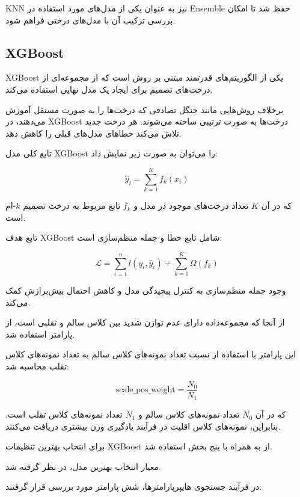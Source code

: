 \documentclass[10pt,a4paper,twocolumn]{article}
\begin{document}
KNN نیز به عنوان یکی از مدل‌های مورد استفاده در Ensemble
حفظ شد تا امکان بررسی ترکیب آن با مدل‌های درختی فراهم شود.


\subsection{XGBoost}

XGBoost یکی از الگوریتم‌های قدرتمند مبتنی بر روش
 است که از مجموعه‌ای از درخت‌های تصمیم
برای ایجاد یک مدل نهایی استفاده می‌کند.

برخلاف روش‌هایی مانند جنگل تصادفی که درخت‌ها را به صورت
مستقل آموزش می‌دهند، در XGBoost درخت‌ها به صورت ترتیبی ساخته
می‌شوند. هر درخت جدید تلاش می‌کند خطاهای مدل‌های قبلی را
کاهش دهد.

تابع کلی مدل XGBoost را می‌توان به صورت زیر نمایش داد:

\[
\hat{y}_i =
\sum_{k=1}^{K} f_k(x_i)
\]

که در آن $K$ تعداد درخت‌های موجود در مدل و $f_k$
تابع مربوط به درخت تصمیم $k$-ام است.

تابع هدف XGBoost شامل تابع خطا و جمله منظم‌سازی است:

\[
\mathcal{L} =
\sum_{i=1}^{n}
l(y_i,\hat{y}_i)
+
\sum_{k=1}^{K}
\Omega(f_k)
\]

وجود جمله منظم‌سازی به کنترل پیچیدگی مدل و کاهش احتمال
بیش‌برازش کمک می‌کند.

از آنجا که مجموعه‌داده دارای عدم توازن شدید بین کلاس سالم
و تقلبی است، از پارامتر
 استفاده شد.

این پارامتر با استفاده از نسبت تعداد نمونه‌های کلاس سالم به
تعداد نمونه‌های کلاس تقلب محاسبه شد:

\[
\text{scale\_pos\_weight}
=
\frac{N_0}{N_1}
\]

که در آن $N_0$ تعداد نمونه‌های کلاس سالم و $N_1$ تعداد
نمونه‌های کلاس تقلب است. بنابراین، نمونه‌های کلاس اقلیت
در فرآیند یادگیری وزن بیشتری دریافت می‌کنند.

برای انتخاب بهترین تنظیمات XGBoost از
 به همراه
 با پنج بخش استفاده شد.

معیار انتخاب بهترین مدل،  در نظر گرفته شد.

در فرآیند جستجوی هایپرپارامترها، شش پارامتر مورد بررسی قرار
گرفتند.
\end{document}
